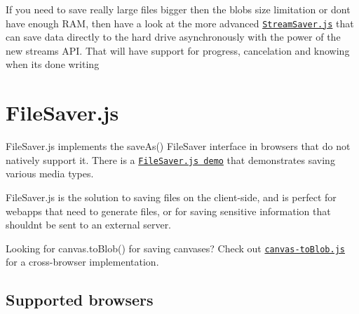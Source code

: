 If you need to save really large files bigger then the blob\textquotesingle{}s size limitation or don\textquotesingle{}t have enough R\+AM, then have a look at the more advanced \href{https://github.com/jimmywarting/StreamSaver.js}{\tt Stream\+Saver.\+js} that can save data directly to the hard drive asynchronously with the power of the new streams A\+PI. That will have support for progress, cancelation and knowing when it\textquotesingle{}s done writing

\section*{File\+Saver.\+js }

File\+Saver.\+js implements the {\ttfamily save\+As()} File\+Saver interface in browsers that do not natively support it. There is a \href{http://eligrey.com/demos/FileSaver.js/}{\tt File\+Saver.\+js demo} that demonstrates saving various media types.

File\+Saver.\+js is the solution to saving files on the client-\/side, and is perfect for webapps that need to generate files, or for saving sensitive information that shouldn\textquotesingle{}t be sent to an external server.

Looking for {\ttfamily canvas.\+to\+Blob()} for saving canvases? Check out \href{https://github.com/eligrey/canvas-toBlob.js}{\tt canvas-\/to\+Blob.\+js} for a cross-\/browser implementation.

\subsection*{Supported browsers }

